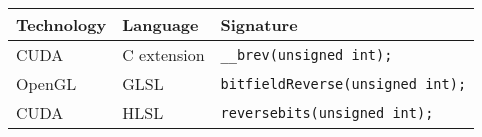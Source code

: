 \begin{tabular}{|l|l|l|}
	\hline
	Technology & Language & Signature \\ \hline
	CUDA & C extension & \texttt{\_\_brev(unsigned int);} \\
	OpenGL & GLSL & \texttt{bitfieldReverse(unsigned int);} \\
	CUDA & HLSL & \texttt{reversebits(unsigned int);} \\ \hline
\end{tabular}